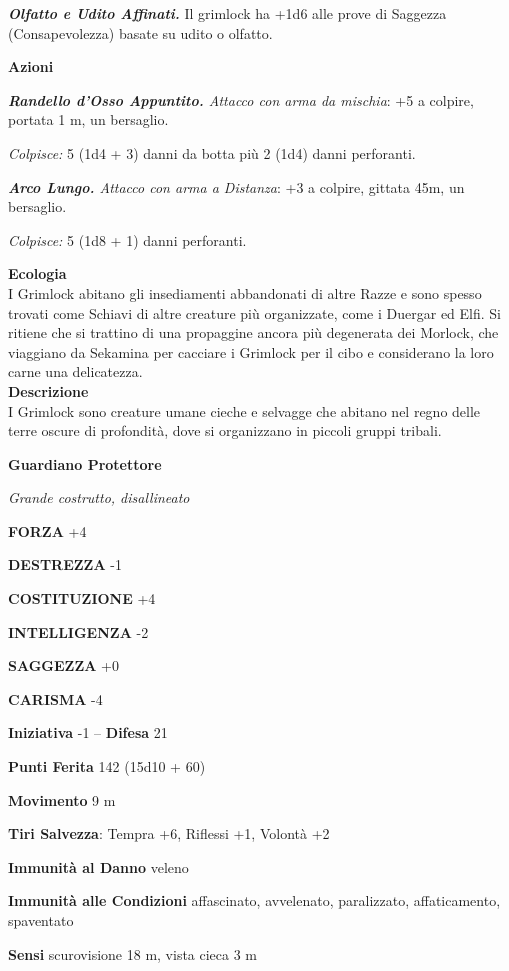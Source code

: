 \begin{multicols}{2}
\textit{\textbf{Olfatto e Udito Affinati.}} Il grimlock ha +1d6 alle prove di Saggezza (Consapevolezza) basate su udito o olfatto.

\textbf{Azioni}

\textit{\textbf{Randello d'Osso Appuntito.} Attacco con arma da mischia}: +5 a colpire, portata 1 m, un bersaglio.

\textit{Colpisce:} 5 (1d4 + 3) danni da botta più 2 (1d4) danni perforanti.

\textit{\textbf{Arco Lungo.} Attacco con arma a Distanza}: +3 a colpire, gittata 45m, un bersaglio.

\textit{Colpisce:} 5 (1d8 + 1) danni perforanti.

\textbf{Ecologia}\\
I Grimlock abitano gli insediamenti abbandonati di altre Razze e sono spesso trovati come Schiavi di altre creature più organizzate, come i Duergar ed Elfi. Si ritiene che si trattino di una propaggine ancora più degenerata dei Morlock, che viaggiano da Sekamina per cacciare i Grimlock per il cibo e considerano la loro carne una delicatezza.\\
\textbf{Descrizione}\\
I Grimlock sono creature umane cieche e selvagge che abitano nel regno delle terre oscure di profondità, dove si organizzano in piccoli gruppi tribali.

\medskip{}\textbf{Guardiano Protettore}

\textit{Grande costrutto, disallineato}

\textbf{FORZA} +4

\textbf{DESTREZZA} -1

\textbf{COSTITUZIONE} +4

\textbf{INTELLIGENZA} -2

\textbf{SAGGEZZA} +0

\textbf{CARISMA} -4

\textbf{Iniziativa} -1 -- \textbf{Difesa} 21

\textbf{Punti Ferita} 142 (15d10 + 60)

\textbf{Movimento} 9 m

\textbf{Tiri Salvezza}: Tempra +6, Riflessi +1, Volontà +2

\textbf{Immunità al Danno} veleno

\textbf{Immunità alle Condizioni} affascinato, avvelenato, paralizzato, affaticamento, spaventato

\textbf{Sensi} scurovisione 18 m, vista cieca 3 m


\end{multicols}
